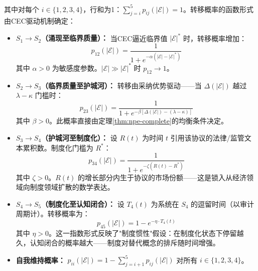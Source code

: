 \documentclass[12pt,a4paper]{ctexart}
\theoremstyle{definition}
\theoremstyle{remark}
\begin{document}
其中对每个 $i \in \{1,2,3,4\}$，行和为1：$\sum_{j=i}^5 p_{ij}(|\mathcal{E}|) = 1$。转移概率的函数形式由CEC驱动机制确定：

\begin{itemize}[itemsep=4pt]
\item \textbf{$S_1 \to S_2$（涌现至临界质量）：} 当CEC逼近临界值 $|\mathcal{E}|^*$ 时，转移概率增加：
\begin{equation}
p_{12}(|\mathcal{E}|) = \frac{1}{1 + e^{-\alpha (|\mathcal{E}| - |\mathcal{E}|^*)}}
\label{eq:p12}
\end{equation}
其中 $\alpha > 0$ 为敏感度参数。$|\mathcal{E}| \gg |\mathcal{E}|^*$ 时 $p_{12} \to 1$。

\item \textbf{$S_2 \to S_3$（临界质量至护城河）：} 转移由采纳优势驱动——当 $\Delta(|\mathcal{E}|)$ 越过 $\lambda - \kappa$ 门槛时：
\begin{equation}
p_{23}(|\mathcal{E}|) = \frac{1}{1 + e^{-\beta [\Delta(|\mathcal{E}|) - (\lambda - \kappa)]}}
\label{eq:p23}
\end{equation}
其中 $\beta > 0$。此概率直接由定理\ref{thm:npe-complete}的均衡条件决定。

\item \textbf{$S_3 \to S_4$（护城河至制度化）：} 设 $R(t)$ 为时间 $t$ 引用该协议的法律/监管文本累积数。制度化门槛为 $R^*$：
\begin{equation}
p_{34}(|\mathcal{E}|) = \frac{1}{1 + e^{-\zeta (R(t) - R^*)}}
\label{eq:p34}
\end{equation}
其中 $\zeta > 0$。$R(t)$ 的增长部分内生于协议的市场份额——这是锁入从经济领域向制度领域扩散的数学表达。

\item \textbf{$S_4 \to S_5$（制度化至认知闭合）：} 设 $T_4(t)$ 为系统在 $S_4$ 的逗留时间（以审计周期计）。转移概率为：
\begin{equation}
p_{45}(|\mathcal{E}|) = 1 - e^{-\eta \cdot T_4(t)}
\label{eq:p45}
\end{equation}
其中 $\eta > 0$。这一指数形式反映了"制度惯性"假设：在制度化状态下停留越久，认知闭合的概率越大——制度对替代概念的排斥随时间增强。

\item \textbf{自我维持概率：} $p_{ii}(|\mathcal{E}|) = 1 - \sum_{j=i+1}^{5} p_{ij}(|\mathcal{E}|)$ 对所有 $i \in \{1,2,3,4\}$。
\end{itemize}
\end{document}
